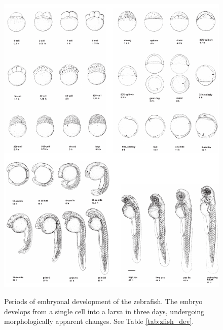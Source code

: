 \begin{figure}
  \centering
  \includegraphics{Chapters/tweezers/Figs/PDF/zebrafish_stages}
    \label{fig:zebrafish_stages}
  \caption{Periods of embryonal development of the zebrafish.
  The embryo develops from a single cell into a larva in three days, undergoing morphologically apparent changes.
  See Table \ref{tab:zfish_dev}.
  }
\end{figure}

